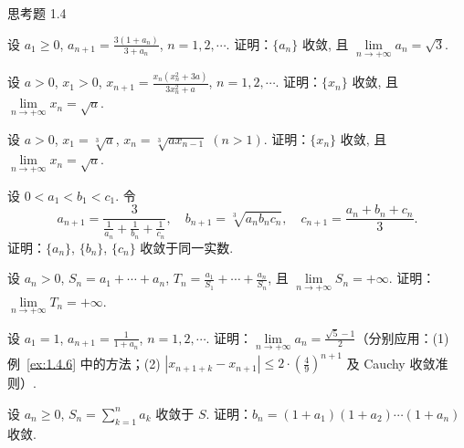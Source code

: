 \begin{exblock}{思考题 1.4}
\item 设 $a_{1} \geqslant 0$, $a_{n+1} = \frac{3(1 + a_{n})}{3 + a_{n}}$, $n = 1, 2, \cdots$. 证明：$\{a_{n}\}$ 收敛, 且 $\lim\limits_{n \to +\infty} a_{n} = \sqrt{3}$.

\item 设 $a > 0$, $x_{1} > 0$, $x_{n+1} = \frac{x_{n}(x_{n}^{2} + 3a)}{3x_{n}^{2} + a}$, $n = 1, 2, \cdots$. 证明：$\{x_{n}\}$ 收敛, 且 $\lim\limits_{n \to +\infty} x_{n} = \sqrt{a}$.

\item 设 $a>0$, $x_{1} = \sqrt[3]{a}$, $x_{n} = \sqrt[3]{ax_{n-1}}\;(n>1)$. 证明：$\{x_{n}\}$ 收敛, 且 $\lim\limits_{n\to+\infty}x_n = \sqrt{a}$.

\item 设 $0 < a_{1} < b_{1} < c_{1}$. 令
\[
a_{n+1} = \frac{3}{\frac{1}{a_{n}} + \frac{1}{b_{n}} + \frac{1}{c_{n}}},\quad b_{n+1} = \sqrt[3]{a_{n} b_{n} c_{n}},\quad c_{n+1} = \frac{a_{n} + b_{n} + c_{n}}{3}.
\]
证明：$\{a_{n}\}$, $\{b_{n}\}$, $\{c_{n}\}$ 收敛于同一实数.

\item 设 $a_{n}>0$, $S_{n} = a_{1} + \cdots + a_{n}$, $T_{n} = \frac{a_{1}}{S_{1}} + \cdots + \frac{a_{n}}{S_{n}}$, 且 $\lim\limits_{n\to+\infty}S_{n} = +\infty$. 证明：$\lim\limits_{n\to+\infty}T_{n} = +\infty$.

\item 设 $a_{1} = 1$, $a_{n+1} = \frac{1}{1+a_{n}}$, $n=1, 2, \cdots$. 证明：$\lim\limits_{n\to+\infty}a_n = \frac{\sqrt{5}-1}{2}$（分别应用：(1) 例~\ref{ex:1.4.6} 中的方法；(2) $|x_{n+1+k} - x_{n+1}| \leqslant 2\cdot\left(\frac{4}{9}\right)^{n+1}$ 及 Cauchy 收敛准则）.

\item 设 $a_{n} \geqslant 0$, $S_{n} = \sum\limits_{k=1}^{n} a_{k}$ 收敛于 $S$. 证明：$b_{n} = (1 + a_{1})(1 + a_{2}) \cdots (1 + a_{n})$ 收敛.
\end{exblock}
